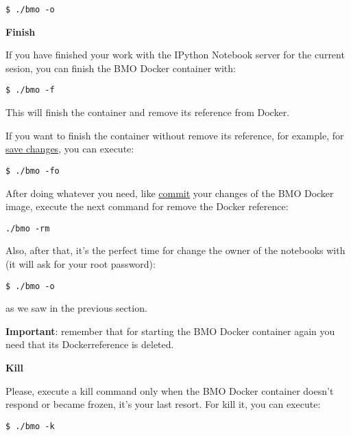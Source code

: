 \vspace*{3mm}
\begin{lstlisting}
$ ./bmo -o
\end{lstlisting}

\large
\textbf{Finish} \label{bmo:1}

\normalsize
If you have finished your work with the IPython Notebook server for the current sesion, you can finish the BMO Docker container with:

\vspace*{3mm}
\begin{lstlisting}
$ ./bmo -f
\end{lstlisting}

This will finish the container and remove its reference from Docker.

If you want to finish the container without remove its reference, for example, for \hyperref[bmo:2]{save changes}, you can execute:

\vspace*{3mm}
\begin{lstlisting}
$ ./bmo -fo
\end{lstlisting}

After doing whatever you need, like \hyperref[bmo:2]{commit} your changes of the BMO Docker image, execute the next command for remove the Docker reference:

\vspace*{3mm}
\begin{lstlisting}
./bmo -rm
\end{lstlisting}

Also, after that, it's the perfect time for change the owner of the notebooks with (it will ask for your root password):

\vspace*{3mm}
\begin{lstlisting}
$ ./bmo -o
\end{lstlisting}

as we saw in the previous section.

\textbf{Important}: remember that for starting the BMO Docker container again you need that its Dockerreference is deleted.

\large
\textbf{Kill}

\normalsize
Please, execute a kill command only when the BMO Docker container doesn't respond or became frozen, it's your last resort. For kill it, you can execute:

\vspace*{3mm}
\begin{lstlisting}
$ ./bmo -k
\end{lstlisting}

